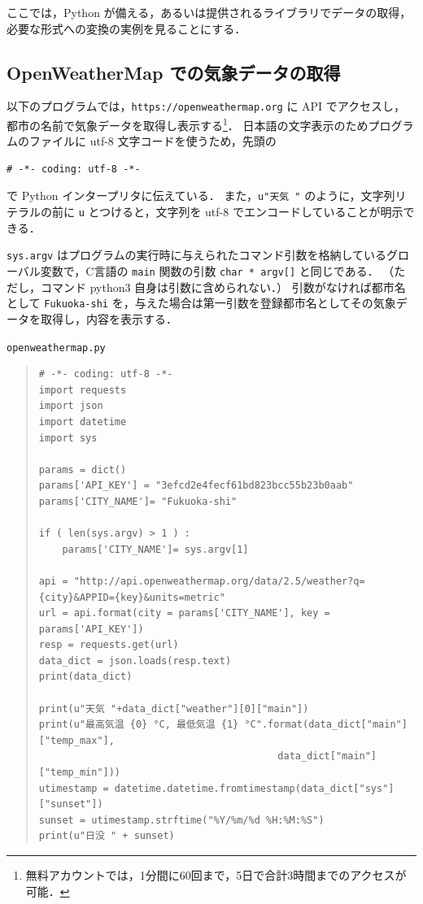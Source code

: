 \documentclass[11pt,a4,epsf]{article}
\begin{document}
ここでは，Python が備える，あるいは提供されるライブラリでデータの取得，必要な形式への変換の実例を見ることにする．

\subsection{OpenWeatherMap での気象データの取得}

以下のプログラムでは，\verb+https://openweathermap.org+ に API でアクセスし，都市の名前で気象データを取得し表示する\footnote{無料アカウントでは，1分間に60回まで，5日で合計3時間までのアクセスが可能．}．
日本語の文字表示のためプログラムのファイルに utf-8 文字コードを使うため，先頭の
\begin{verbatim}
# -*- coding: utf-8 -*-
\end{verbatim}
で Python インタープリタに伝えている．
また，\verb+u"天気 "+  のように，文字列リテラルの前に \verb+u+ とつけると，文字列を utf-8 でエンコードしていることが明示できる．

\verb+sys.argv+ はプログラムの実行時に与えられたコマンド引数を格納しているグローバル変数で，C言語の \verb+main+ 関数の引数 \verb+char * argv[]+ と同じである．
（ただし，コマンド python3 自身は引数に含められない．）
引数がなければ都市名として \verb+Fukuoka-shi+ を，与えた場合は第一引数を登録都市名としてその気象データを取得し，内容を表示する．

\begin{itembox}[l]{\tt openweathermap.py}
\begin{quote}
\small
\begin{verbatim}
# -*- coding: utf-8 -*-
import requests
import json
import datetime
import sys

params = dict()
params['API_KEY'] = "3efcd2e4fecf61bd823bcc55b23b0aab"
params['CITY_NAME']= "Fukuoka-shi"

if ( len(sys.argv) > 1 ) :
    params['CITY_NAME']= sys.argv[1]

api = "http://api.openweathermap.org/data/2.5/weather?q={city}&APPID={key}&units=metric"
url = api.format(city = params['CITY_NAME'], key = params['API_KEY'])
resp = requests.get(url)
data_dict = json.loads(resp.text)
print(data_dict)

print(u"天気 "+data_dict["weather"][0]["main"])
print(u"最高気温 {0} °C, 最低気温 {1} °C".format(data_dict["main"]["temp_max"], 
                                         data_dict["main"]["temp_min"]))
utimestamp = datetime.datetime.fromtimestamp(data_dict["sys"]["sunset"])
sunset = utimestamp.strftime("%Y/%m/%d %H:%M:%S")
print(u"日没 " + sunset)
\end{verbatim}
\end{quote}
\end{itembox}
\end{document}
